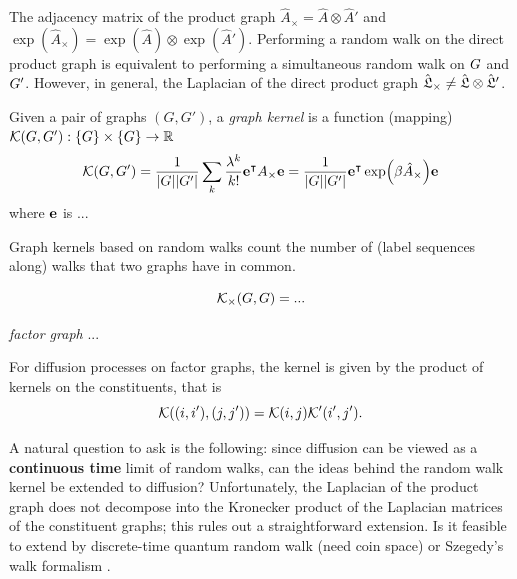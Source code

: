 \begin{remark}
	The adjacency matrix of the product graph $\hat{A}_{\times}=\hat{A}\otimes \hat{A}'$ and $\exp(\hat{A}_{\times})=\exp(\hat{A})\otimes \exp(\hat{A}')$.	
	Performing a random walk on the direct product graph is equivalent to performing a simultaneous random walk on $G$ and $G'$.
	However, in general, the Laplacian of the direct product graph 
	$\hat{\mathfrak{L}}_{\times}\neq \hat{\mathfrak{L}}\otimes \hat{\mathfrak{L}}'$.
\end{remark}
\begin{definition}\label{def:graph_kernel}
	Given a pair of graphs $(G,G')$,
	a \emph{graph kernel} is a function (mapping)
	$\mathcal{K}(G,G'): \qty{ G} \times \qty{ G} \to \mathbb{R}$
	\begin{equation}
		\mathcal{K}(G,G') =
		\frac{1}{\abs{G}\abs{G'}}
		\sum_k \frac{\lambda^k}{k!} \vb{e}^\intercal A_{\times} \vb{e}
		=\frac{1}{\abs{G}\abs{G'}}
		\vb{e}^\intercal \exp(\beta \hat{A}_{\times}) \vb{e}
	\end{equation}
	where $\vb{e}$ is ...
\end{definition}
Graph kernels based on random walks count the number of (label sequences along) walks that two graphs have in common.
\begin{definition}
	\begin{equation}
		\mathcal{K}_{\times}(G,G) = ...
	\end{equation}
\end{definition}
\begin{definition}
	\emph{factor graph} ...
\end{definition}
For diffusion processes on factor graphs, the kernel is given by the product of kernels on the constituents, that is 
\begin{equation}
	\mathcal{K}((i, i'), (j, j')) = \mathcal{K}(i, j) \mathcal{K}' (i' , j' ).
\end{equation}
\begin{remark}
	A natural question to ask is the following: since diffusion can be viewed as a \textbf{continuous time} limit of random walks, can the ideas behind the random walk kernel be extended to diffusion? Unfortunately, the Laplacian of the product graph does not decompose into the Kronecker product of the Laplacian matrices of the constituent graphs; this rules out a straightforward extension.
	Is it feasible to extend by discrete-time quantum random walk (need coin space) \cite{ambainisCoinsMakeQuantum2005} or
	Szegedy's walk formalism
	\cite{szegedySpectraQuantizedWalks2004}.
\end{remark}

